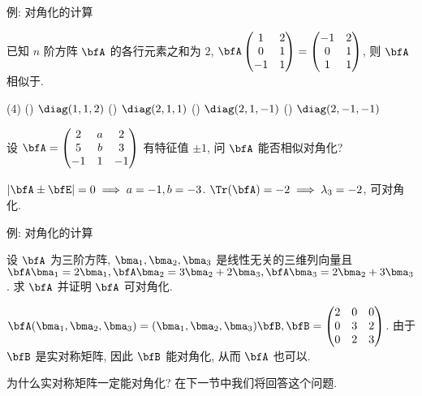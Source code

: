 \begin{frame}{例: 对角化的计算}
	\onslide<+->
	\begin{example}
		已知 $n$ 阶方阵 $\bfA$ 的各行元素之和为 $2$, $\bfA\begin{pmatrix}
			1&2\\
			0&1\\
			-1&1
		\end{pmatrix}=\begin{pmatrix}
			-1&2\\
			0&1\\
			1&1
		\end{pmatrix}$, 则 $\bfA$ 相似于.
		
		\begin{taskschoice}(4)
			() $\diag(1,1,2)$
			() $\diag(2,1,1)$
			() $\diag(2,1,-1)$
			() $\diag(2,-1,-1)$
		\end{taskschoice}
	\end{example}
	\onslide<+->
	\begin{exercise}
		设 $\bfA=\begin{pmatrix}
			2&a&2\\
			5&b&3\\
			-1&1&-1
		\end{pmatrix}$ 有特征值 $\pm1$, 问 $\bfA$ 能否相似对角化?
	\end{exercise}
	\onslide<+->
	\begin{answer}
		$|\bfA\pm\bfE|=0\implies a=-1,b=-3$.
		$\Tr(\bfA)=-2\implies\lambda_3=-2$, 可对角化.
	\end{answer}
\end{frame}


\begin{frame}{例: 对角化的计算}
	\onslide<+->
	\begin{example}
		设 $\bfA$ 为三阶方阵, $\bma_1,\bma_2,\bma_3$ 是线性无关的三维列向量且 $\bfA\bma_1=2\bma_1,\bfA\bma_2=3\bma_2+2\bma_3,\bfA\bma_3=2\bma_2+3\bma_3$.
		求 $\bfA$ 并证明 $\bfA$ 可对角化.
	\end{example}
	\onslide<+->
	\begin{solution}
		$\bfA(\bma_1,\bma_2,\bma_3)=(\bma_1,\bma_2,\bma_3)\bfB,\bfB=\begin{pmatrix}
			2&0&0\\
			0&3&2\\
			0&2&3
		\end{pmatrix}$.
		由于 $\bfB$ 是实对称矩阵, 因此 $\bfB$ 能对角化, 从而 $\bfA$ 也可以.
	\end{solution}
	\onslide<+->
	为什么实对称矩阵一定能对角化?
	在下一节中我们将回答这个问题.
\end{frame}


